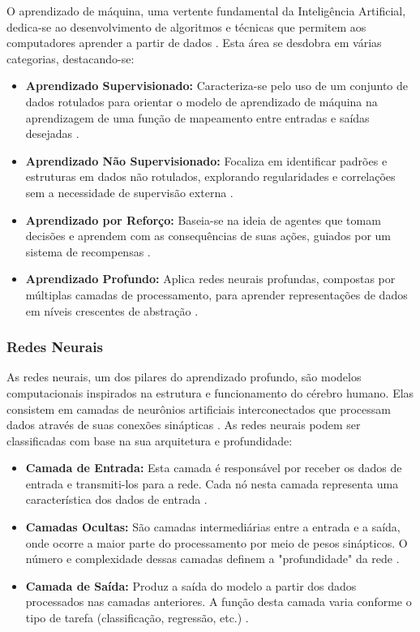 \documentclass[conference]{IEEEtran}
\begin{document}
O aprendizado de máquina, uma vertente fundamental da Inteligência Artificial, 
dedica-se ao desenvolvimento de algoritmos e técnicas que permitem aos computadores 
aprender a partir de dados \cite{Bishop2006}. 
Esta área se desdobra em várias categorias, destacando-se:

\begin{itemize}
\item {\textbf{Aprendizado Supervisionado:}}
Caracteriza-se pelo uso de um conjunto de dados rotulados para orientar o modelo 
de aprendizado de máquina na aprendizagem de uma função de mapeamento entre 
entradas e saídas desejadas \cite{Mohri2018}.
\item {\textbf{Aprendizado Não Supervisionado:}}
Focaliza em identificar padrões e estruturas em dados não rotulados, 
explorando regularidades e correlações sem a necessidade de supervisão externa \cite{Hinton2006}.
\item {\textbf{Aprendizado por Reforço:}}
Baseia-se na ideia de agentes que tomam decisões e aprendem com 
as consequências de suas ações, guiados por um sistema de recompensas \cite{Sutton2018}.
\item {\textbf{Aprendizado Profundo:}}
Aplica redes neurais profundas, compostas por múltiplas camadas de processamento, 
para aprender representações de dados em níveis crescentes de abstração \cite{LeCun2015}.
\end{itemize}

\subsubsection{Redes Neurais} As redes neurais, um dos pilares do aprendizado profundo, 
são modelos computacionais inspirados na estrutura e funcionamento do cérebro humano. 
Elas consistem em camadas de neurônios artificiais interconectados que processam dados 
através de suas conexões sinápticas \cite{Haykin2009}. 
As redes neurais podem ser classificadas com base na sua arquitetura e profundidade:

\begin{itemize}
\item {\textbf{Camada de Entrada:}}
Esta camada é responsável por receber os dados de entrada e transmiti-los para a rede. 
Cada nó nesta camada representa uma característica dos dados de entrada \cite{Goodfellow2016}.
\item {\textbf{Camadas Ocultas:}}
São camadas intermediárias entre a entrada e a saída, onde ocorre a maior parte do 
processamento por meio de pesos sinápticos. O número e complexidade dessas camadas 
definem a "profundidade" da rede \cite{Schmidhuber2015}.
\item {\textbf{Camada de Saída:}}
Produz a saída do modelo a partir dos dados processados nas camadas anteriores. 
A função desta camada varia conforme o 
tipo de tarefa (classificação, regressão, etc.) \cite{LeCun2015}.
\end{itemize}
\end{document}
